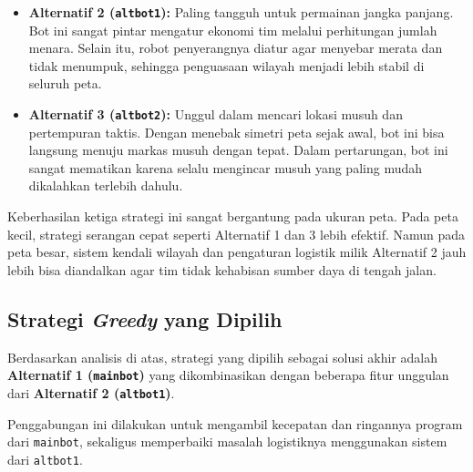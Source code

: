 \begin{enumerate}
\begin{itemize}
        \item \textbf{Alternatif 2 (\texttt{altbot1}):} Paling tangguh untuk permainan jangka panjang. Bot ini sangat pintar mengatur ekonomi tim melalui perhitungan jumlah menara. Selain itu, robot penyerangnya diatur agar menyebar merata dan tidak menumpuk, sehingga penguasaan wilayah menjadi lebih stabil di seluruh peta.
        
        \item \textbf{Alternatif 3 (\texttt{altbot2}):} Unggul dalam mencari lokasi musuh dan pertempuran taktis. Dengan menebak simetri peta sejak awal, bot ini bisa langsung menuju markas musuh dengan tepat. Dalam pertarungan, bot ini sangat mematikan karena selalu mengincar musuh yang paling mudah dikalahkan terlebih dahulu.
    \end{itemize}
\end{enumerate}

Keberhasilan ketiga strategi ini sangat bergantung pada ukuran peta. Pada peta kecil, strategi serangan cepat seperti Alternatif 1 dan 3 lebih efektif. Namun pada peta besar, sistem kendali wilayah dan pengaturan logistik milik Alternatif 2 jauh lebih bisa diandalkan agar tim tidak kehabisan sumber daya di tengah jalan.

\subsection{Strategi \textit{Greedy} yang Dipilih}

Berdasarkan analisis di atas, strategi yang dipilih sebagai solusi akhir adalah \textbf{Alternatif 1 (\texttt{mainbot})} yang dikombinasikan dengan beberapa fitur unggulan dari \textbf{Alternatif 2 (\texttt{altbot1})}. 

Penggabungan ini dilakukan untuk mengambil kecepatan dan ringannya program dari \texttt{mainbot}, sekaligus memperbaiki masalah logistiknya menggunakan sistem dari \texttt{altbot1}.

